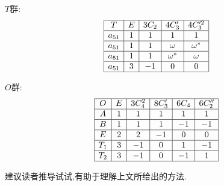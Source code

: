 \documentclass{ctexart}
\begin{document}
$T$群:
\[
\begin{array}{|c|c|c|c|c|}
\hline
T&E&3C_{2}&4C_{3}'&4C_{3}'^{2}\\
\hline
a_{51} &1&1&1&1\\
\hline
a_{51} &1&1&\omega&\omega^{*}\\
\hline
a_{51} &1&1&\omega^{*}&\omega\\
\hline
a_{51} &3&-1&0&0\\
\hline

\end{array}
\]

$O$群:
\[
\begin{array}{|c|c|c|c|c|c|}
\hline
O&E&3C_{4}^{2}&8C_{3}'&6C_{4}&6C_{2}''\\
\hline
A&1&1&1&1&1\\
\hline
B&1&1&1&-1&-1\\
\hline
E&2&2&-1&0&0\\
\hline
T_{1}&3&-1&0&1&-1\\
\hline
T_{2}&3&-1&0&-1&1\\
\hline
\end{array}
\]

建议读者推导试试,有助于理解上文所给出的方法.
\end{document}
